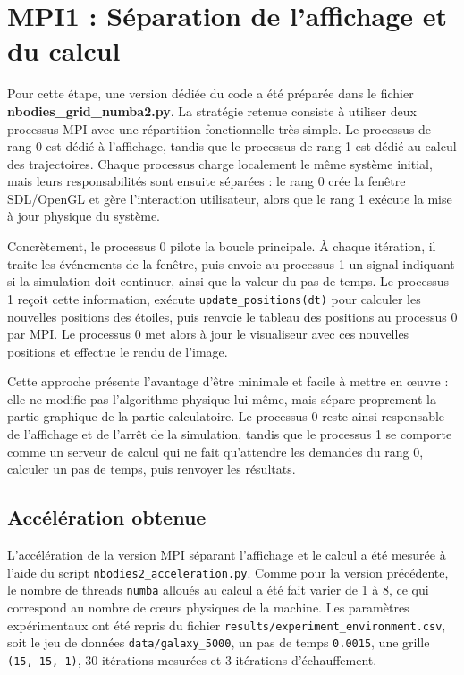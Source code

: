 \documentclass[11pt,a4paper]{article}
\begin{document}
\section{MPI1 : Séparation de l'affichage et du calcul}

Pour cette étape, une version dédiée du code a été préparée 
dans le fichier \textbf{nbodies\_grid\_numba2.py}.
La stratégie retenue consiste à utiliser deux processus MPI avec une répartition fonctionnelle très simple. Le processus de rang 0 est dédié à l'affichage, tandis que le processus de rang 1 est dédié au calcul des trajectoires. Chaque processus charge localement le même système initial, mais leurs responsabilités sont ensuite séparées : le rang 0 crée la fenêtre SDL/OpenGL et gère l'interaction utilisateur, alors que le rang 1 exécute la mise à jour physique du système.

Concrètement, le processus 0 pilote la boucle principale. À chaque itération, il traite les événements de la fenêtre, puis envoie au processus 1 un signal indiquant si la simulation doit continuer, ainsi que la valeur du pas de temps. Le processus 1 reçoit cette information, exécute \texttt{update\_positions(dt)} pour calculer les nouvelles positions des étoiles, puis renvoie le tableau des positions au processus 0 par MPI. Le processus 0 met alors à jour le visualiseur avec ces nouvelles positions et effectue le rendu de l'image.

Cette approche présente l'avantage d'être minimale et facile à mettre en œuvre : elle ne modifie pas l'algorithme physique lui-même, mais sépare proprement la partie graphique de la partie calculatoire. Le processus 0 reste ainsi responsable de l'affichage et de l'arrêt de la simulation, tandis que le processus 1 se comporte comme un serveur de calcul qui ne fait qu'attendre les demandes du rang 0, calculer un pas de temps, puis renvoyer les résultats.

\subsection{Accélération obtenue}

L'accélération de la version MPI séparant l'affichage et le calcul a été mesurée à l'aide du script \texttt{nbodies2\_acceleration.py}. Comme pour la version précédente, le nombre de threads \texttt{numba} alloués au calcul a été fait varier de 1 à 8, ce qui correspond au nombre de cœurs physiques de la machine. Les paramètres expérimentaux ont été repris du fichier \texttt{results/experiment\_environment.csv}, soit le jeu de données \texttt{data/galaxy\_5000}, un pas de temps \texttt{0.0015}, une grille \texttt{(15, 15, 1)}, 30 itérations mesurées et 3 itérations d'échauffement.
\end{document}
